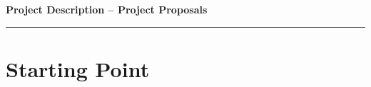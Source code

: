 \documentclass{scrartcl}
\newcommand{\applicants}{[First name  last name, city of all applicants]}
\newcommand{\project}{[Project title]}
\begin{document}
\pagestyle{empty}
\setcounter{page}{1}

%

\cleardoublepage
\pagestyle{plain}


{\raggedright{} \normalsize \bfseries 
	Project Description -- Project Proposals \newline \par
	\applicants{} \newline \par
	\project{} \par
	\rule{\textwidth}{0.5pt} \par
}

\section{Starting Point}
\label{sec:work-report}
\end{document}
